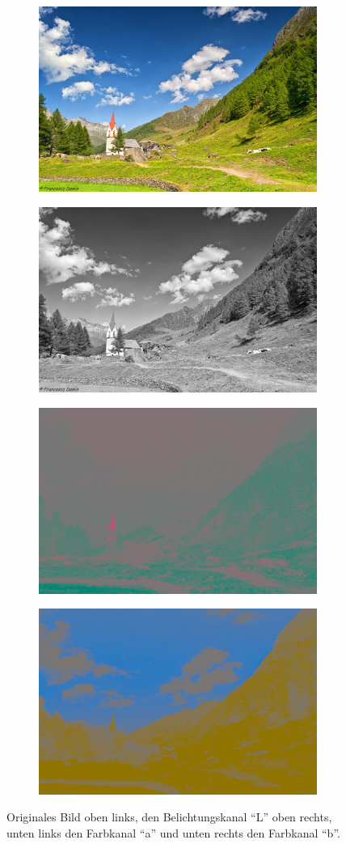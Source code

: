 \begin{figure}[H]
  \vspace{1cm}
  \begin{subfigure}
    \centering
    \includegraphics[width=.5\textwidth]{resources/colorspace/image.jpg}
  \end{subfigure}
  \begin{subfigure}
    \centering
    \includegraphics[width=.5\textwidth]{resources/colorspace/grayscale.png}
  \end{subfigure}
  \begin{subfigure}
    \centering
    \includegraphics[width=.5\textwidth]{resources/colorspace/a_channel.png}
  \end{subfigure}
  \begin{subfigure}
    \centering
    \includegraphics[width=.5\textwidth]{resources/colorspace/b_channel.png}
  \end{subfigure}
  \caption{Originales Bild oben links, den Belichtungskanal ``L'' oben rechts, unten links den Farbkanal ``a'' und unten rechts den Farbkanal ``b''.}
  \label{fig:fig}
\end{figure}

